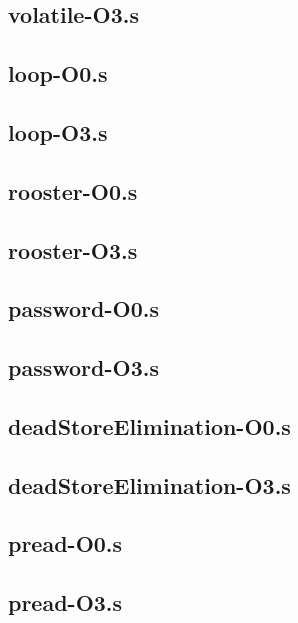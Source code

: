 \begin{appendices}
\subsection{volatile-O3.s}


\subsection{loop-O0.s}

\subsection{loop-O3.s}


\subsection{rooster-O0.s}

\subsection{rooster-O3.s}


\subsection{password-O0.s}

\subsection{password-O3.s}


\subsection{deadStoreElimination-O0.s}

\subsection{deadStoreElimination-O3.s}


\subsection{pread-O0.s}

\subsection{pread-O3.s}

\end{appendices}